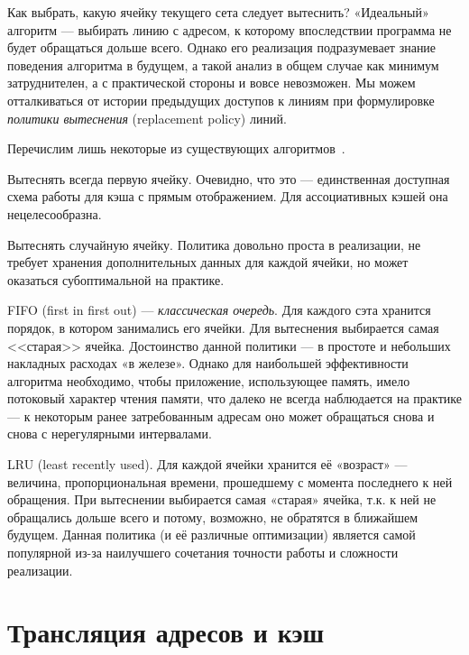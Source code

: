 Как выбрать, какую ячейку текущего сета следует вытеснить? «Идеальный» алгоритм — выбирать линию с адресом, к которому впоследствии программа не будет обращаться дольше всего. Однако  его реализация подразумевает знание поведения алгоритма в будущем, а такой анализ в общем случае как минимум затруднителен, а с практической стороны и вовсе невозможен. Мы можем отталкиваться от истории предыдущих доступов к линиям при формулировке \textit{политики вытеснения} (\abbr replacement policy) линий.

Перечислим лишь некоторые из существующих алгоритмов~\cite{arc}.

\begin{itemize*}
\item    Вытеснять всегда первую ячейку. Очевидно, что это — единственная доступная схема работы для кэша с прямым отображением. Для ассоциативных кэшей она нецелесообразна.

\item    Вытеснять случайную ячейку. Политика довольно проста в реализации, не требует хранения дополнительных данных для каждой ячейки, но может оказаться субоптимальной на практике.

\item    FIFO (\abbr first in first out) — \textit{классическая очередь}. Для каждого сэта хранится порядок, в котором занимались его ячейки. Для вытеснения выбирается самая <<старая>> ячейка. Достоинство данной политики — в простоте и небольших накладных расходах «в железе». Однако для наибольшей эффективности алгоритма необходимо, чтобы приложение, использующее память, имело потоковый характер чтения памяти, что далеко не всегда наблюдается на практике — к некоторым ранее затребованным адресам оно может обращаться снова и снова с нерегулярными интервалами.

\item    LRU (\abbr least recently used). Для каждой ячейки хранится её «возраст» — величина, пропорциональная времени, прошедшему с момента последнего к ней обращения. При вытеснении выбирается самая «старая» ячейка, т.к. к ней не обращались дольше всего и потому, возможно, не обратятся в ближайшем будущем. Данная политика (и её различные оптимизации) является самой популярной из-за наилучшего сочетания точности работы и сложности реализации.

\end{itemize*}

\section{Трансляция адресов и кэш}

